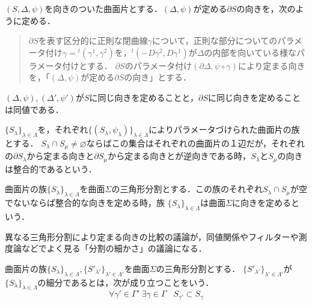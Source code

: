 \documentclass[uplatex, dvipdfmx]{jsreport}
\begin{document}
\begin{definition}
    $(S,\Delta,\psi)$を向きのついた曲面片とする．$(\Delta,\psi)$が定める$\partial S$の向きを，次のように定める．
    \begin{quotation}
        $\partial S$を表す区分的に正則な閉曲線$\gamma$について，正則な部分についてのパラメータ付け$\gamma={}^t(\gamma^1,\gamma^2)$を，${}^t(-D\gamma^2,D\gamma^1)$が$\Delta$の内部を向いている様なパラメータ付けとする．
        $\partial S$のパラメータ付け$(\partial\Delta,\psi\circ\gamma)$により定まる向きを，「$(\Delta,\psi)$が定める$\partial S$の向き」とする．
    \end{quotation}
\end{definition}

\begin{lemma}
    $(\Delta,\psi),(\Delta',\psi')$が$S$に同じ向きを定めることと，$\partial S$に同じ向きを定めることは同値である．
\end{lemma}

\begin{definition}[曲面片の族の向き]
    $\{S_\lambda\}_{\lambda\in\Lambda}$を，それぞれ$\{(S_\lambda,\psi_\lambda)\}_{\lambda\in\Lambda}$によりパラメータづけられた曲面片の族とする．
    $S_\lambda\cap S_\mu\ne\varnothing$ならばこの集合はそれぞれの曲面片の１辺だが，それぞれの$\partial S_\lambda$から定まる向きと$\partial S_\mu$から定まる向きとが逆向きである時，$S_\lambda$と$S_\mu$の向きは整合的であるという．
\end{definition}

\begin{definition}
    曲面片の族$\{S_\lambda\}_{\lambda\in\Lambda}$を曲面$\Sigma$の三角形分割とする．この族のそれぞれ$S_\lambda\cap S_\mu$が空でないならば整合的な向きを定める時，族
    $\{S_\lambda\}_{\lambda\in\Lambda}$は曲面$\Sigma$に向きを定めるという．
\end{definition}

異なる三角形分割により定まる向きの比較の議論が，同値関係やフィルターや測度論などでよく見る「分割の細かさ」の議論になる．
\begin{definition}[refinement]
    曲面片の族$\{S_\lambda\}_{\lambda\in\Lambda},\{S'_{\lambda'}\}_{\lambda'\in\Lambda'}$を曲面$\Sigma$の三角形分割とする．
    $\{S'_{\lambda'}\}_{\lambda'\in\Lambda'}$が$\{S_\lambda\}_{\lambda\in\Lambda}$の細分であるとは，次が成り立つことをいう．
    \[ \forall \gamma'\in\Gamma'\;\exists\gamma\in\Gamma\;\;\; S_{\gamma'}\subset S_\gamma \]
\end{definition}
\end{document}
